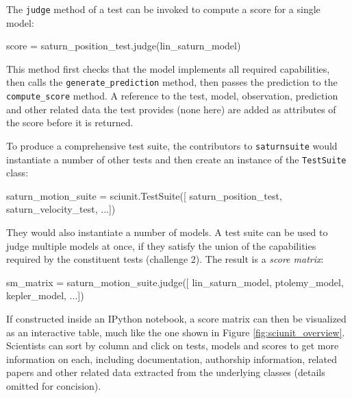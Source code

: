 \documentclass[9pt]{sig-alternate}
\newcommand{\verbx}[1]{\lstinline{#1}}
\begin{document}
The \verbx{judge} method of a test can be invoked to compute a score for a single model: 
\vspace{-4px}
\begin{python}
score = saturn_position_test.judge(lin_saturn_model)
\end{python}
\vspace{-5px}
This method first checks that the model implements all required capabilities, then calls the \verbx{generate_prediction} method, then passes the prediction to the \verbx{compute_score} method. A reference to the test,   model, observation, prediction and other related data the test provides (none here) are added as attributes of the score before it is returned.

To produce a comprehensive test suite, the contributors to \verbx{saturnsuite} would instantiate a number of other tests and then create an instance of the \verbx{TestSuite} class:
\begin{python}
saturn_motion_suite = sciunit.TestSuite([
  saturn_position_test, saturn_velocity_test, ...])
\end{python}
They would also instantiate a number of models. A test suite can be used to judge multiple models at once, if they satisfy the union of the capabilities required by the constituent tests (challenge 2). The result is a \emph{score matrix}:
\begin{python}
sm_matrix = saturn_motion_suite.judge([
  lin_saturn_model, ptolemy_model, kepler_model, ...])
\end{python}

If constructed inside an IPython notebook, a score matrix can then be visualized as an interactive table, much like the one shown in Figure \ref{fig:sciunit_overview}. Scientists can sort by column and click on tests, models and scores to get more information on each, including documentation, authorship information, related papers and other related data extracted from the underlying classes (details omitted for concision).

 
\end{document}
